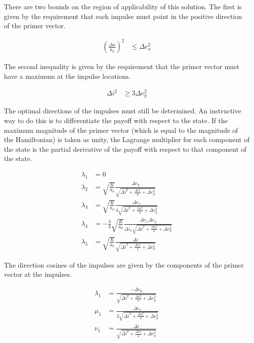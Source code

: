 \documentclass[12pt]{article}
\begin{document}
There are two bounds on the region of applicability of this solution. The first is given by the requirement that each impulse must point in the positive direction of the primer vector.

\begin{align}
\left( \frac{\Delta a}{a_0} \right)^2 &\leq \Delta e_x^2 \tag{39}
\end{align}

The second inequality is given by the requirement that the primer vector must have a maximum at the impulse locations.

\begin{align}
\Delta i^2 &\geq 3 \Delta e_y^2 \tag{40}
\end{align}

The optimal directions of the impulses must still be determined. An instructive way to do this is to differentiate the payoff with respect to the state. If the maximum magnitude of the primer vector (which is equal to the magnitude of the Hamiltonian) is taken as unity, the Lagrange multiplier for each component of the state is the partial derivative of the payoff with respect to that component of the state.

\begin{align}
\lambda_1 &= 0 \tag{41} \\
\lambda_2 &= \sqrt{\frac{K}{a_0}} \frac{\Delta e_y}{\sqrt{\Delta i^2 + \frac{\Delta e_x^2}{4} + \Delta e_y^2}} \tag{42} \\
\lambda_3 &= \sqrt{\frac{K}{a_0}} \frac{\Delta e_x}{4\sqrt{\Delta i^2 + \frac{\Delta e_x^2}{4} + \Delta e_y^2}} \tag{43} \\
\lambda_4 &= -\frac{3}{4} \sqrt{\frac{K}{a_0}} \frac{\Delta e_x \Delta e_y}{\Delta i_x \sqrt{\Delta i^2 + \frac{\Delta e_x^2}{4} + \Delta e_y^2}} \tag{44} \\
\lambda_5 &= \sqrt{\frac{K}{a_0}} \frac{\Delta i}{\sqrt{\Delta i^2 + \frac{\Delta e_x^2}{4} + \Delta e_y^2}} \tag{45}
\end{align}

The direction cosines of the impulses are given by the components of the primer vector at the impulses.

\begin{align}
\lambda_1 &= \frac{-\Delta e_y}{\sqrt{\Delta i^2 + \frac{\Delta e_x^2}{4} + \Delta e_y^2}} \tag{46} \\
\mu_1 &= \frac{\Delta e_x}{2\sqrt{\Delta i^2 + \frac{\Delta e_x^2}{4} + \Delta e_y^2}} \tag{47} \\
\nu_1 &= \frac{\Delta i}{\sqrt{\Delta i^2 + \frac{\Delta e_x^2}{4} + \Delta e_y^2}} \tag{48}
\end{align}
\end{document}

